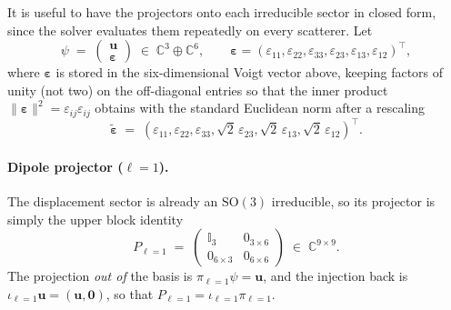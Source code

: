 \documentclass[11pt,a4paper]{article}
\newcommand{\eps}{\varepsilon}
\newcommand{\uu}{\bm{u}}
\theoremstyle{plain}
\theoremstyle{definition}
\theoremstyle{remark}
\begin{document}
It is useful to have the projectors onto each irreducible sector in
closed form, since the solver evaluates them repeatedly on every
scatterer.  Let
\begin{equation}
  \psi \;=\; \begin{pmatrix} \uu \\ \bm{\eps} \end{pmatrix}
  \;\in\; \mathbb{C}^3\oplus \mathbb{C}^6,
  \qquad
  \bm{\eps}=(\eps_{11},\eps_{22},\eps_{33},\eps_{23},\eps_{13},\eps_{12})^\top,
  \label{eq:psi-voigt}
\end{equation}
where $\bm{\eps}$ is stored in the six-dimensional Voigt vector above,
keeping factors of unity (not two) on the off-diagonal entries so that
the inner product $\|\bm{\eps}\|^2 = \eps_{ij}\eps_{ij}$ obtains with the
standard Euclidean norm after a rescaling
\begin{equation}
  \tilde{\bm{\eps}}
  \;=\;
  (\eps_{11},\eps_{22},\eps_{33},\sqrt{2}\,\eps_{23},\sqrt{2}\,\eps_{13},\sqrt{2}\,\eps_{12})^\top.
  \label{eq:voigt-norm}
\end{equation}

\paragraph{Dipole projector ($\ell=1$).}
The displacement sector is already an $\mathrm{SO}(3)$ irreducible, so
its projector is simply the upper block identity
\begin{equation}
  P_{\ell=1}
  \;=\;
  \begin{pmatrix}
    \mathbb{I}_3 & 0_{3\times 6}\\
    0_{6\times 3} & 0_{6\times 6}
  \end{pmatrix}
  \;\in\;\mathbb{C}^{9\times 9}.
  \label{eq:P1}
\end{equation}
The projection \emph{out of} the basis is
$\pi_{\ell=1}\psi = \uu$, and the injection back is
$\iota_{\ell=1}\uu=(\uu,\bm{0})$, so that
$P_{\ell=1}=\iota_{\ell=1}\pi_{\ell=1}$.
\end{document}
